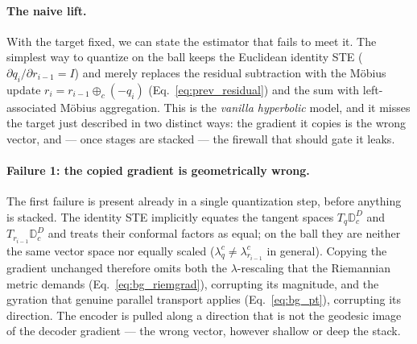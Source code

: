 \documentclass[12pt]{report}
\begin{document}
\paragraph{The naive lift.}
With the target fixed, we can state the estimator that fails to meet it. The simplest way to quantize on the ball keeps the Euclidean identity STE ($\partial q_i/\partial r_{i-1}=I$) and merely replaces the residual subtraction with the M\"obius update $r_i=r_{i-1}\oplus_c(-q_i)$ (Eq.~\ref{eq:prev_residual}) and the sum with left-associated M\"obius aggregation. This is the \emph{vanilla hyperbolic} model, and it misses the target just described in two distinct ways: the gradient it copies is the wrong vector, and --- once stages are stacked --- the firewall that should gate it leaks.

\paragraph{Failure 1: the copied gradient is geometrically wrong.}
The first failure is present already in a single quantization step, before anything is stacked. The identity STE implicitly equates the tangent spaces $T_{q}\mathbb{D}_c^D$ and $T_{r_{i-1}}\mathbb{D}_c^D$ and treats their conformal factors as equal; on the ball they are neither the same vector space nor equally scaled ($\lambda^c_{q}\neq\lambda^c_{r_{i-1}}$ in general). Copying the gradient unchanged therefore omits both the $\lambda$-rescaling that the Riemannian metric demands (Eq.~\ref{eq:bg_riemgrad}), corrupting its magnitude, and the gyration that genuine parallel transport applies (Eq.~\ref{eq:bg_pt}), corrupting its direction. The encoder is pulled along a direction that is not the geodesic image of the decoder gradient --- the wrong vector, however shallow or deep the stack.
\end{document}
